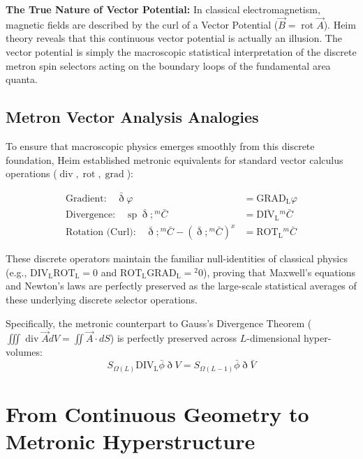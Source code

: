 \documentclass[11pt,a4paper,oneside]{article}
\DeclareMathOperator{\spn}{sp}
\newcommand{\ethop}{\eth}
\begin{document}
\begin{mbbcite}
    \textbf{The True Nature of Vector Potential:} In classical electromagnetism, magnetic fields are described by the curl of a Vector Potential ($\vec{B} = \operatorname{rot}\vec{A}$). Heim theory reveals that this continuous vector potential is actually an illusion. The vector potential is simply the macroscopic statistical interpretation of the discrete metron spin selectors acting on the boundary loops of the fundamental area quanta.
\end{mbbcite}
\subsection{Metron Vector Analysis Analogies}

To ensure that macroscopic physics emerges smoothly from this discrete foundation, Heim established metronic equivalents for standard vector calculus operations ($\operatorname{div}, \operatorname{rot}, \operatorname{grad}$):

\begin{align}
    \text{Gradient:} \quad \bar{\ethop} \varphi &= \mathrm{GRAD_L} \varphi \\
    \text{Divergence:} \quad \spn \bar{\ethop}; {}^m \bar{C} &= \overline{\mathrm{DIV_L}} {}^m \bar{C} \\
    \text{Rotation (Curl):} \quad \bar{\ethop}; {}^m \bar{C} - (\bar{\ethop}; {}^m \bar{C})^x &= \mathrm{ROT_L} {}^m \bar{C}
\end{align}

These discrete operators maintain the familiar null-identities of classical physics (e.g., $\mathrm{DIV_L} \mathrm{ROT_L} = 0$ and $\mathrm{ROT_L} \mathrm{GRAD_L} = {}^2 0$), proving that Maxwell's equations and Newton's laws are perfectly preserved as the large-scale statistical averages of these underlying discrete selector operations. 

Specifically, the metronic counterpart to Gauss's Divergence Theorem ($\iiint \operatorname{div} \vec{A} dV = \iint \vec{A} \cdot dS$) is perfectly preserved across $L$-dimensional hyper-volumes:
\begin{equation}
    S_{\Omega(L)} \mathrm{DIV_L} \bar{\phi} \ethop V = S_{\Omega(L-1)} \bar{\phi} \ethop \bar{V}
\end{equation}
\section{From Continuous Geometry to Metronic Hyperstructure}
\label{sec:polymetric_condensation}
\end{document}
